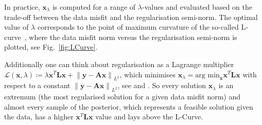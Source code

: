 In practice, $\bm{x}_{\lambda}$ is computed for a range of $\lambda$-values and evaluated based on the trade-off between the data misfit and the regularisation semi-norm. The optimal value of $\lambda$ corresponds to the point of maximum curvature of the so-called L-curve~\cite{hansen1993use}, where the data misfit norm versus the regularisation semi-norm is plotted, see Fig.~\ref{fig:LCurve}.

Additionally one can think about regularisation as a Lagrange multiplier $ \mathcal {L}(\bm{x}, \lambda) \coloneq\lambda \bm{x}^T \bm{L} \bm{x} + \left\lVert \bm{y} - \bm{A} \bm{x} \right\rVert_{L^2} $, which minimises $ \bm{x}_\lambda = \text{arg min}_{\bm{x}} \bm{x}^T \bm{L} \bm{x} $ with respect to a constant $\left\lVert \bm{y} - \bm{A} \bm{x} \right\rVert_{L^2}$, see \cite[fn. 6]{fox2016fast} and \cite[Fig. 2.13]{SANTOSH202265}.
So every solution $\bm{x}_{\lambda}$ is an extremum (the most regularised solution for a given data misfit norm) and almost every sample of the posterior, which represents a feasible solution given the data, has a higher $\bm{x}^T \bm{L} \bm{x}$ value and lays above the L-Curve.


%
%
%
%
%
%
%
%
%
%
%




